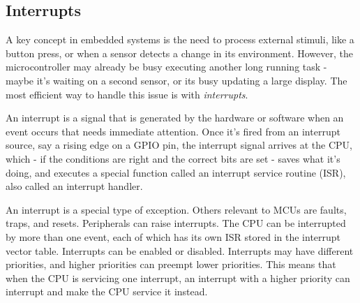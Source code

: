 \subsection{Interrupts}
A key concept in embedded systems is the need to process external stimuli,
like a button press, or when a sensor detects a change in its environment.
However, the microcontroller may already be busy executing another long
running task - maybe it's waiting on a second sensor, or its busy updating
a large display. The most efficient way to handle this issue is with
\emph{interrupts}.

An interrupt is a signal that is generated by the hardware or software
when an event occurs that needs immediate attention. Once it's fired
from an interrupt source, say a rising edge on a GPIO pin, the
interrupt signal arrives at the CPU, which - if the conditions are right
and the correct bits are set - saves what it's doing, and executes a
special function called an interrupt service routine (ISR), also called
an interrupt handler.

An interrupt is a special type of exception. Others relevant to MCUs are
faults, traps, and resets. Peripherals can raise interrupts. The
CPU can be interrupted by more than one event, each of which has its own
ISR stored in the interrupt vector table. Interrupts can be enabled or
disabled. Interrupts may have different priorities, and higher priorities
can preempt lower priorities. This means that when the CPU is servicing
one interrupt, an interrupt with a higher priority can interrupt and make
the CPU service it instead.


